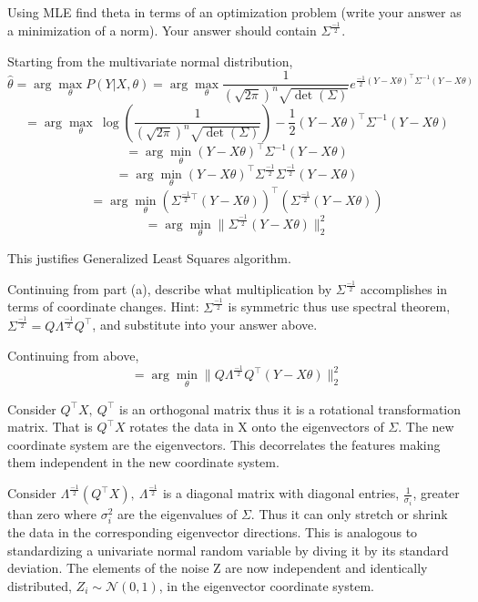 \begin{Parts}
\Part
Using MLE find theta in terms of an optimization problem (write your answer as a minimization of a norm). Your answer should contain $\Sigma^{\frac{-1}{2}}$.

\begin{solution}
    Starting from the multivariate normal distribution, 
    $$\hat \theta = \arg \max_\theta P(Y|X, \theta) = \arg \max_\theta \frac{1}{(\sqrt{2\pi})^n \sqrt{\det(\Sigma)}}  e^{\frac{-1}{2} (Y - X\theta)^\top \Sigma^{-1} (Y - X\theta)}$$
    $$ = \arg \max_\theta \ \log(\frac{1}{(\sqrt{2\pi})^n \sqrt{\det(\Sigma)}}) - \frac{1}{2}(Y - X\theta)^\top\Sigma^{-1}(Y-X\theta)$$
    $$ = \arg \min_\theta (Y-X\theta)^\top\Sigma^{-1}(Y-X\theta)$$
    $$ = \arg \min_\theta  (Y-X\theta)^\top\Sigma^{\frac{-1}{2}}\Sigma^{\frac{-1}{2}}(Y-X\theta) $$
    $$ = \arg \min_\theta (\Sigma^{\frac{-1}{2}\top} (Y-X\theta))^\top(\Sigma^{\frac{-1}{2}} (Y-X\theta)) $$
    $$ = \arg \min_\theta \|\Sigma^{\frac{-1}{2}} (Y-X\theta)\|^2_2 $$
    
    This justifies Generalized Least Squares algorithm.
\end{solution}

\Part
Continuing from part (a), describe what multiplication by $\Sigma^{\frac{-1}{2}}$  accomplishes in terms of coordinate changes. Hint: $\Sigma^{\frac{-1}{2}}$ is symmetric thus use spectral theorem, $\Sigma^{\frac{-1}{2}} = Q\Lambda^{\frac{-1}{2}}Q^\top$, and substitute into your answer above.

\begin{solution}
    Continuing from above, 
    $$ = \arg \min_\theta \| Q\Lambda^{\frac{-1}{2}}Q^\top (Y-X\theta) \|^2_2 $$
    
    Consider $ Q^\top X, \ Q^\top $ is an orthogonal matrix thus it is a rotational transformation matrix. That is $ Q^\top X $ rotates the data in X onto the eigenvectors of $\Sigma$. The new coordinate system are the eigenvectors. This decorrelates the features making them independent in the new coordinate system.
    
    Consider $ \Lambda^{\frac{-1}{2}} (Q^\top X) , \  \Lambda^{\frac{-1}{2}} $ is a diagonal matrix with diagonal entries, $\frac{1}{\sigma_i}$, greater than zero where $\sigma_i^2$ are the eigenvalues of $\Sigma$. Thus it can only stretch or shrink the data in the corresponding eigenvector directions. This is analogous to standardizing a univariate normal random variable by diving it by its standard deviation. The elements of the noise Z are now independent and identically distributed, $ Z_i \sim \mathcal N(0,1) $, in the eigenvector coordinate system.
    

\end{solution}
\end{Parts}

